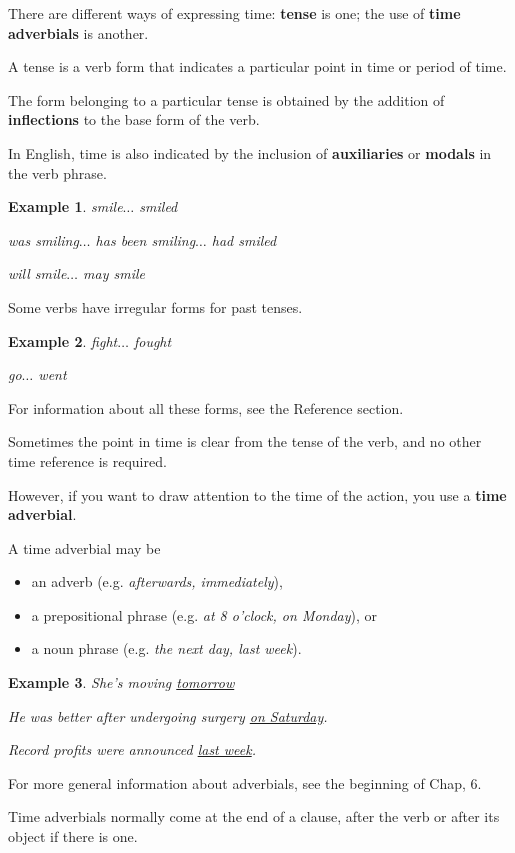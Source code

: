 \documentclass[oneside]{book}
\numberwithin{equation}{section}
\newtheorem{example}{Example}[section]
\begin{document}
There are different ways of expressing time: \textbf{tense} is one; the use of \textbf{time adverbials} is another.

%
A tense is a verb form that indicates a particular point in time or period of time.

%
The form belonging to a particular tense is obtained by the addition of \textbf{inflections} to the base form of the verb.

In English, time is also indicated by the inclusion of \textbf{auxiliaries} or \textbf{modals} in the verb phrase.
\begin{example}
    smile$\ldots$ smiled
    
    was smiling$\ldots$ has been smiling$\ldots$ had smiled
    
    will smile$\ldots$ may smile
\end{example}
Some verbs have irregular forms for past tenses.
\begin{example}
    fight$\ldots$ fought
    
    go$\ldots$ went
\end{example}
For information about all these forms, see the Reference section.

%
\noindent{} Sometimes the point in time is clear from the tense of the verb, and no other time reference is required.

However, if you want to draw attention to the time of the action, you use a \textbf{time adverbial}.

%
A time adverbial may be
\begin{itemize}
    \item[(i)] an adverb (e.g. \textit{afterwards, immediately}),
    \item[(ii)] a prepositional phrase (e.g. \textit{at 8 o'clock, on Monday}), or
    \item[(iii)] a noun phrase (e.g. \textit{the next day, last week}).
\end{itemize}
\begin{example}
    She's moving \underline{tomorrow}
    
    He was better after undergoing surgery \underline{on Saturday}.
    
    Record profits were announced \underline{last week}.
\end{example}
For more general information about adverbials, see the beginning of Chap, 6.

%
\noindent{} Time adverbials normally come at the end of a clause, after the verb or after its object if there is one.
\end{document}
